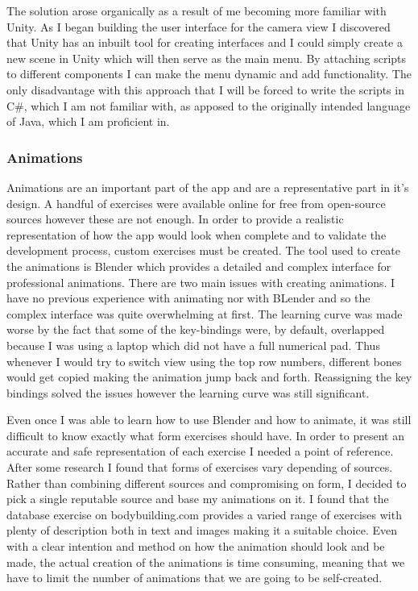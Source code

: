\documentclass{l4proj}
\begin{document}
The solution arose organically as a result of me becoming more familiar with Unity. As I began building the user interface for the camera view I discovered that Unity has an inbuilt tool for creating interfaces and I could simply create a new scene in Unity which will then serve as the main menu. By attaching scripts to different components I can make the menu dynamic and add functionality. The only disadvantage with this approach that I will be forced to write the scripts in C\#, which I am not familiar with, as apposed to the originally intended language of Java, which I am proficient in. 

\subsubsection{Animations}
Animations are an important part of the app and are a representative part in it's design. A handful of exercises were available online for free from open-source sources however these are not enough. In order to provide a realistic representation of how the app would look when complete and to validate the development process, custom exercises must be created. The tool used to create the animations is Blender which provides a detailed and complex interface for professional animations. There are two main issues with creating animations. I have no previous experience with animating nor with BLender and so the complex interface was quite overwhelming at first. The learning curve was made worse by the fact that some of the key-bindings were, by default, overlapped because I was using a laptop which did not have a full numerical pad. Thus whenever I would try to switch view using the top row numbers, different bones would get copied making the animation jump back and forth. Reassigning the key bindings solved the issues however the learning curve was still significant.

Even once I was able to learn how to use Blender and how to animate, it was still difficult to know exactly what form exercises should have. In order to present an accurate and safe representation of each exercise I needed a point of reference. After some research I found that forms of exercises vary depending of sources. Rather than combining different sources and compromising on form, I decided to pick a single reputable source and base my animations on it.  I found that the database exercise on bodybuilding.com provides a varied range of exercises with plenty of description both in text and images making it a suitable choice. Even with a clear intention and method on how the animation should look and be made, the actual creation of the animations is time consuming, meaning that we have to limit the number of animations that we are going to be self-created.
\end{document}
